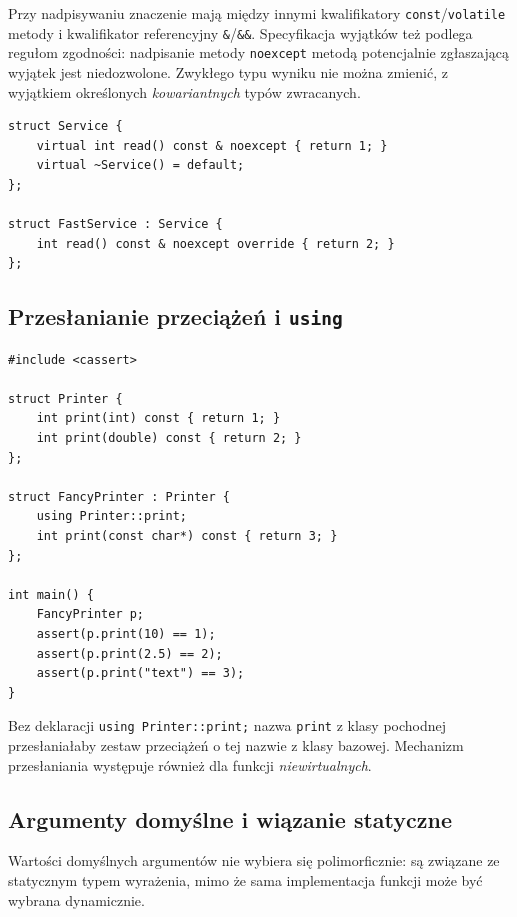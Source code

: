 \noindent Przy nadpisywaniu znaczenie mają między innymi kwalifikatory
\texttt{const}/\texttt{volatile} metody i kwalifikator referencyjny
\texttt{\&}/\texttt{\&\&}. Specyfikacja wyjątków też podlega regułom
zgodności: nadpisanie metody \texttt{noexcept} metodą potencjalnie
zgłaszającą wyjątek jest niedozwolone. Zwykłego typu wyniku nie można
zmienić, z wyjątkiem określonych \emph{kowariantnych} typów zwracanych.

\begin{lstlisting}[caption={noexcept i kwalifikatory referencyjne w nadpisywaniu; fragment.}]
struct Service {
    virtual int read() const & noexcept { return 1; }
    virtual ~Service() = default;
};

struct FastService : Service {
    int read() const & noexcept override { return 2; }
};
\end{lstlisting}

\subsection{Przesłanianie przeciążeń i \texttt{using}}

\begin{lstlisting}[caption={Odsłanianie przeciążeń klasy bazowej; kompletny program.}]
#include <cassert>

struct Printer {
    int print(int) const { return 1; }
    int print(double) const { return 2; }
};

struct FancyPrinter : Printer {
    using Printer::print;
    int print(const char*) const { return 3; }
};

int main() {
    FancyPrinter p;
    assert(p.print(10) == 1);
    assert(p.print(2.5) == 2);
    assert(p.print("text") == 3);
}
\end{lstlisting}

Bez deklaracji \texttt{using Printer::print;} nazwa \texttt{print}
z klasy pochodnej przesłaniałaby zestaw przeciążeń o tej nazwie
z klasy bazowej. Mechanizm przesłaniania występuje również dla
funkcji \emph{niewirtualnych}.

\subsection{Argumenty domyślne i wiązanie statyczne}

Wartości domyślnych argumentów nie wybiera się polimorficznie:
są związane ze statycznym typem wyrażenia, mimo że sama implementacja
funkcji może być wybrana dynamicznie.

